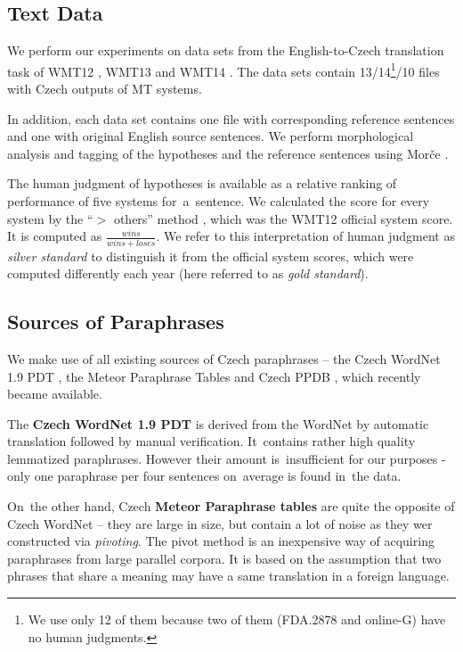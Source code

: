 \documentclass[11pt]{article}
\def\Tref#1{Table~\ref{#1}}
\begin{document}
\subsection{Text Data}
We perform our experiments on data sets from the English-to-Czech translation 
task of WMT12 \cite{wmt12}, WMT13 \cite{wmt13} and WMT14 \cite{wmt14}. The data 
sets contain 13/14\footnote{We use only 12 of them because two of them (FDA.2878 
and online-G) have no human judgments.}/10 files with Czech outputs of MT systems.

In addition, each data set contains one file with corresponding reference sentences 
and one with original English source sentences. We perform morphological analysis 
and tagging of the hypotheses and the reference sentences using Morče \cite{morce:2007}.

The human judgment of hypotheses is available as a relative ranking of performance of 
five systems for~a~sentence. We calculated the score for every system by the “$ > $ others” 
method \cite{bojar-grains}, which was the WMT12 official system score. It is computed 
as $ \frac{wins}{wins+loses} $. We refer to this interpretation of human judgment as 
\textit{silver standard} to distinguish it from the official system scores, which were 
computed differently each year (here referred to as \textit{gold standard}).

\subsection{Sources of Paraphrases}
\label{meteori}
We make use of all existing sources of Czech paraphrases -- the Czech WordNet 1.9 PDT 
\cite{czech-wordnet}, the Meteor Paraphrase Tables \cite{meteor-tables} and Czech PPDB %
, which recently became available.

The \textbf{Czech WordNet 1.9 PDT} is derived from the WordNet \cite{wordnet} by automatic translation 
followed by manual verification. It~contains rather high quality lemmatized paraphrases. However 
their amount is~insufficient for our purposes %
- only one paraphrase per four sentences on~average is found in~the data. %

On~the other hand, Czech \textbf{Meteor Paraphrase tables} are quite the opposite of 
Czech WordNet -- they are large in size, but contain a lot of noise as they wer constructed
via \textit{pivoting}. \cite{pivoting} The pivot method is an inexpensive way of acquiring 
paraphrases from large parallel corpora. It is based on the assumption that two phrases that 
share a meaning may have a same translation in a foreign language. \cite{dyvik}
\end{document}
